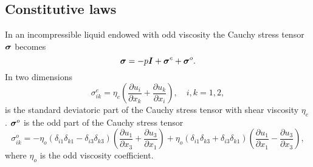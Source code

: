 \documentclass[%
 amsmath,amssymb,
 aps,
10.5pt]{revtex4-2}
\def\bm#1{\mbox{\boldmath{$#1$}}}
\def\rr#1{(\ref{#1})}
\newcommand{\be}{\begin{equation}}
\newcommand{\ee}{\end{equation}}
\begin{document}
\subsection{Constitutive laws}
In an incompressible liquid endowed with odd viscosity the Cauchy stress tensor $\bm{\sigma}$
becomes \citep{Avron1998}
\be\label{totalstress}
\bm{\sigma} =-p\bm{I}+ \bm{\sigma}^e + \bm{\sigma}^o. 
\ee 
In two dimensions 
\be \label{evenstress}
\sigma^e_{ik} = \eta_e \left( \frac{\partial u_i}{\partial x_k} + \frac{\partial u_k}{\partial x_i}
\right) , \quad i,k=1,2,
\ee
is the standard deviatoric part of the Cauchy stress tensor with shear viscosity
$\eta_e$. 
$\bm{\sigma}^o$ is the odd part of the Cauchy stress tensor
\cite{Avron1998,Lapa2014}
\be  \label{oddstress}
\sigma^o_{ik} = - \eta_o (\delta_{i1}\delta_{k1} - \delta_{i3}\delta_{k3} ) 
\left( \frac{\partial u_1}{\partial x_3} +\frac{\partial u_3}{\partial x_1}  \right)
+ \eta_o \left( \delta_{i1}\delta_{k3} + \delta_{i3} \delta_{k1}    \right) 
\left( \frac{\partial u_1}{\partial x_1} - \frac{\partial u_3}{\partial x_3}\right),
\ee
where $\eta_o$ is the odd viscosity coefficient. 
%
\end{document}
